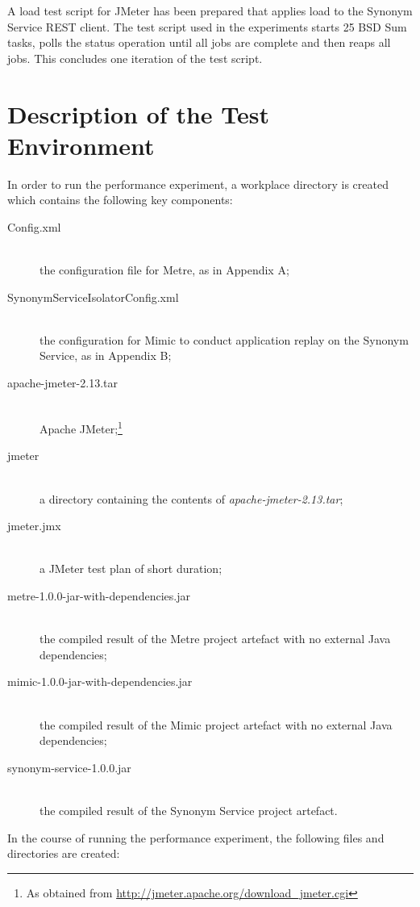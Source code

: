 \documentclass[]{final_report}
\begin{document}
A load test script for JMeter has been prepared that applies load to the Synonym Service REST client. The test script used in the experiments starts 25 BSD Sum tasks, polls the status operation until all jobs are complete and then reaps all jobs. This concludes one iteration of the test script.

\section{Description of the Test Environment}

In order to run the performance experiment, a workplace directory is created which contains the following key components:

\begin{description}
\item[Config.xml] \hfill \\  the configuration file for Metre, as in Appendix A;
\item[SynonymServiceIsolatorConfig.xml] \hfill \\  the configuration for Mimic to conduct application replay on the Synonym Service, as in Appendix B;
\item[apache-jmeter-2.13.tar] \hfill \\  Apache JMeter;\footnote{As obtained from \url{http://jmeter.apache.org/download_jmeter.cgi}}
\item[jmeter] \hfill \\  a directory containing the contents of \textit{apache-jmeter-2.13.tar};
\item[jmeter.jmx] \hfill \\  a JMeter test plan of short duration;
\item[metre-1.0.0-jar-with-dependencies.jar] \hfill \\  the compiled result of the Metre project artefact with no external Java dependencies;
\item[mimic-1.0.0-jar-with-dependencies.jar] \hfill \\  the compiled result of the Mimic project artefact with no external Java dependencies;
\item[synonym-service-1.0.0.jar] \hfill \\  the compiled result of the Synonym Service project artefact.
\end{description}

In the course of running the performance experiment, the following files and directories are created:
\end{document}
